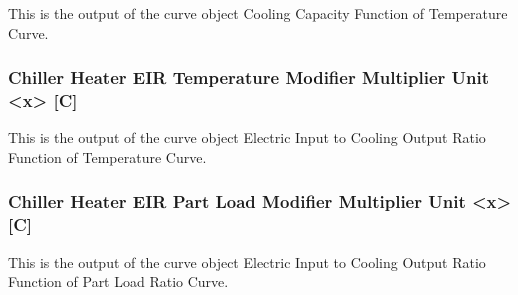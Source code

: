 This is the output of the curve object Cooling Capacity Function of Temperature Curve.

\subsubsection{Chiller Heater EIR Temperature Modifier Multiplier Unit \textless{}x\textgreater{} {[}C{]}}\label{chiller-heater-eir-temperature-modifier-multiplier-unit-x-c}

This is the output of the curve object Electric Input to Cooling Output Ratio Function of Temperature Curve.

\subsubsection{Chiller Heater EIR Part Load Modifier Multiplier Unit \textless{}x\textgreater{} {[}C{]}}\label{chiller-heater-eir-part-load-modifier-multiplier-unit-x-c}

This is the output of the curve object Electric Input to Cooling Output Ratio Function of Part Load Ratio Curve.
